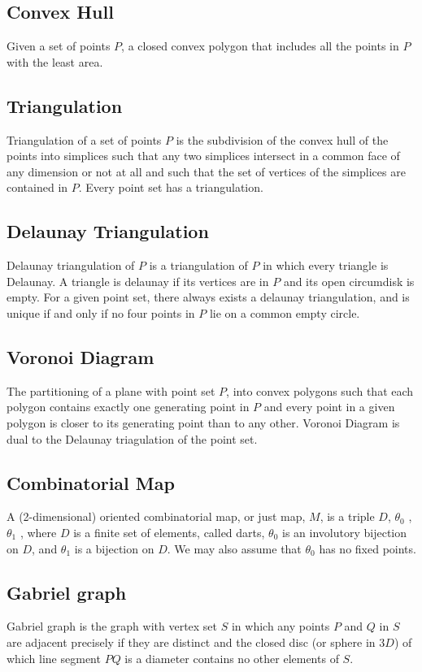 \documentclass[preprint,5p,times,twocolumn]{elsarticle}
\begin{document}
\subsection{Convex Hull} Given a set of points $P$, a closed convex polygon that includes all the points in $P$ with the least area.

\subsection{Triangulation}
Triangulation of a set of points $P$ is the subdivision of the convex hull of the points into simplices such that any two simplices intersect in a common face of any dimension or not at all and such that the set of vertices of the simplices are contained in $P$. Every point set has a triangulation. 

\subsection{Delaunay Triangulation}
Delaunay triangulation of $P$ is a triangulation of $P$ in which every triangle is Delaunay. A triangle is delaunay if its vertices are in $P$ and its open circumdisk is empty. For a given point set, there always exists a delaunay triangulation, and is unique if and only if no four points in $P$ lie on a common empty circle.

\subsection{Voronoi Diagram}
The partitioning of a plane with point set $P$, into convex polygons such that each polygon contains exactly one generating point in $P$ and every point in a given polygon is closer to its generating point than to any other. Voronoi Diagram is dual to the Delaunay triagulation of the point set.

\subsection{Combinatorial Map}
A (2-dimensional) oriented combinatorial map, or just map, $M$, is a triple $D$, $\theta_0$ , $\theta_1$ , where $D$ is a finite set of elements, called darts, $\theta_0$ is an involutory bijection on $D$, and $\theta_1$ is a bijection on $D$. We may also assume that $\theta_0$ has no fixed points.

\subsection{Gabriel graph}
Gabriel graph is the graph with vertex set $S$ in which any points $P$ and $Q$ in $S$ are adjacent precisely if they are distinct and the closed disc (or sphere in $3D$) of which line segment $PQ$ is a diameter contains no other elements of $S$.
\end{document}

